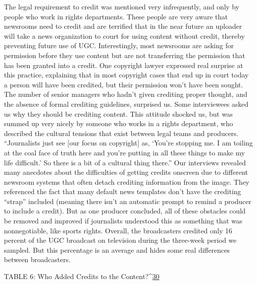 \begin{enumerate}
The legal requirement to credit was mentioned very infrequently, and only
by people who work in rights departments. These people are very aware
that newsrooms need to credit and are terrified that in the near future an
uploader will take a news organization to court for using content without
credit, thereby preventing future use of UGC.
Interestingly, most newsrooms are asking for permission before they use
content but are not transferring the permission that has been granted into
a credit. One copyright lawyer expressed real surprise at this practice,
explaining that in most copyright cases that end up in court today a person
will have been credited, but their permission won't have been sought.
The number of senior managers who hadn't given crediting proper thought,
and the absence of formal crediting guidelines, surprised us. Some interviewees
asked us why they should be crediting content. This attitude
shocked us, but was summed up very nicely by someone who works in a
rights department, who described the cultural tensions that exist between
legal teams and producers. ``Journalists just see [our focus on copyright] as,
‘You're stopping me. I am toiling at the coal face of truth here and you're
putting in all these things to make my life difficult.' So there is a bit of a cultural
thing there.''
Our interviews revealed many anecdotes about the difficulties of getting
credits onscreen due to different newsroom systems that often detach
crediting information from the image. They referenced the fact that many
default news templates don't have the crediting ``strap'' included (meaning
there isn't an automatic prompt to remind a producer to include a credit).
But as one producer concluded, all of these obstacles could be removed
and improved if journalists understood this as something that was nonnegotiable,
like sports rights.
Overall, the broadcasters credited only 16 percent of the UGC broadcast on
television during the three-week period we sampled. But this percentage is
an average and hides some real differences between broadcasters.

TABLE 6: Who Added Credits to the Content?^{\href{#endnotes}{30}}


\end{enumerate}
